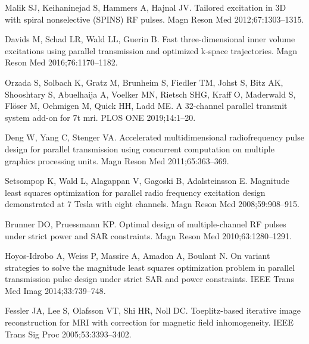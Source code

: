 \documentclass[11pt]{article}
\begin{document}
\begin{thebibliography}{10}
Malik SJ, Keihaninejad S, Hammers A, Hajnal JV.
\newblock Tailored excitation in {3D} with spiral nonselective {(SPINS) RF}
  pulses.
\newblock Magn Reson Med 2012;\hspace{0pt}67:1303--1315.

Davids M, Schad LR, Wald LL, Guerin B.
\newblock Fast three-dimensional inner volume excitations using parallel
  transmission and optimized k-space trajectories.
\newblock Magn Reson Med 2016;\hspace{0pt}76:1170--1182.

Orzada S, Solbach K, Gratz M, Brunheim S, Fiedler TM, Johst S, Bitz AK,
  Shooshtary S, Abuelhaija A, Voelker MN, Rietsch SHG, Kraff O, Maderwald S,
  Fl\"oser M, Oehmigen M, Quick HH, Ladd ME.
\newblock A 32-channel parallel transmit system add-on for 7t mri.
\newblock PLOS ONE 2019;\hspace{0pt}14:1--20.

Deng W, Yang C, Stenger VA.
\newblock Accelerated multidimensional radiofrequency pulse design for parallel
  transmission using concurrent computation on multiple graphics processing
  units.
\newblock Magn Reson Med 2011;\hspace{0pt}65:363--369.

Setsompop K, Wald L, Alagappan V, Gagoski B, Adalsteinsson E.
\newblock Magnitude least squares optimization for parallel radio frequency
  excitation design demonstrated at 7 {Tesla} with eight channels.
\newblock Magn Reson Med 2008;\hspace{0pt}59:908--915.

Brunner DO, Pruessmann KP.
\newblock Optimal design of multiple-channel {RF} pulses under strict power and
  {SAR} constraints.
\newblock Magn Reson Med 2010;\hspace{0pt}63:1280--1291.

Hoyos-Idrobo A, Weiss P, Massire A, Amadon A, Boulant N.
\newblock On variant strategies to solve the magnitude least squares
  optimization problem in parallel transmission pulse design under strict {SAR}
  and power constraints.
\newblock IEEE Trans Med Imag 2014;\hspace{0pt}33:739--748.

Fessler JA, Lee S, Olafsson VT, Shi HR, Noll DC.
\newblock Toeplitz-based iterative image reconstruction for {MRI} with
  correction for magnetic field inhomogeneity.
\newblock IEEE Trans Sig Proc 2005;\hspace{0pt}53:3393--3402.


\end{thebibliography}
\end{document}

